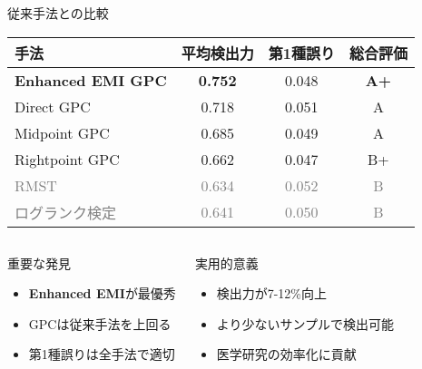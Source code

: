 \documentclass[11pt,aspectratio=169]{beamer}
\begin{document}
\begin{frame}{従来手法との比較}
\begin{table}[h]
\centering
\begin{tabular}{|l|c|c|c|}
\hline
\textbf{手法} & \textbf{平均検出力} & \textbf{第1種誤り} & \textbf{総合評価} \\
\hline
\textcolor{accent}{\textbf{Enhanced EMI GPC}} & \textbf{0.752} & 0.048 & \textcolor{accent}{\textbf{A+}} \\
\hline
Direct GPC & 0.718 & 0.051 & A \\
\hline
Midpoint GPC & 0.685 & 0.049 & A \\
\hline
Rightpoint GPC & 0.662 & 0.047 & B+ \\
\hline
\textcolor{gray}{RMST} & \textcolor{gray}{0.634} & \textcolor{gray}{0.052} & \textcolor{gray}{B} \\
\hline
\textcolor{gray}{ログランク検定} & \textcolor{gray}{0.641} & \textcolor{gray}{0.050} & \textcolor{gray}{B} \\
\hline
\end{tabular}
\end{table}

\vspace{1em}

\begin{columns}
\begin{block}{重要な発見}
\begin{itemize}
\item \textcolor{accent}{\textbf{Enhanced EMI}}が最優秀
\item GPCは従来手法を上回る
\item 第1種誤りは全手法で適切
\end{itemize}
\end{block}

\begin{exampleblock}{実用的意義}
\begin{itemize}
\item 検出力が7-12\%向上
\item より少ないサンプルで検出可能
\item 医学研究の効率化に貢献
\end{itemize}
\end{exampleblock}
\end{columns}
\end{frame}
\end{document}
